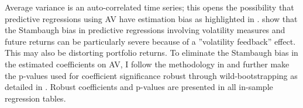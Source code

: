 

Average variance is an auto-correlated time series; this opens the possibility that predictive regressions using AV have estimation bias as highlighted in \citet{stambaugh_predictive_1999}. \citet{campbell_no_1992} show that the Stambaugh bias in predictive regressions involving volatility measures and future returns can be particularly severe because of a ”volatility feedback” effect. This may also be distorting portfolio returns. To eliminate the Stambaugh bias in the estimated coefficients on AV, I follow the methodology in \citet{Amihud2004} and further make the p-values used for coefficient significance robust through wild-bootstrapping as detailed in \citet{mackinnon_bootstrap_2002}. Robust coefficients and p-values are presented in all in-sample regression tables.

